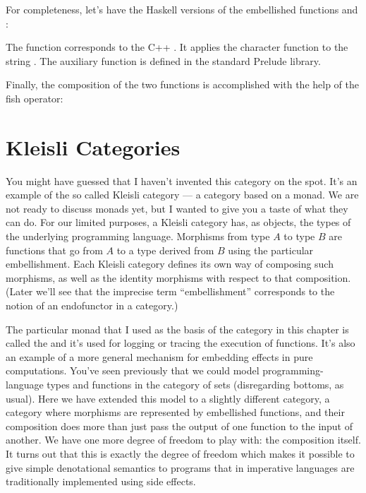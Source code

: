 For completeness, let's have the Haskell versions of the embellished
functions  and :

The function  corresponds to the C++ . It
applies the character function  to the string
. The auxiliary function  is defined in the
standard Prelude library.

Finally, the composition of the two functions is accomplished with the
help of the fish operator:


\section{Kleisli Categories}

You might have guessed that I haven't invented this category on the
spot. It's an example of the so called Kleisli category --- a category
based on a monad. We are not ready to discuss monads yet, but I wanted
to give you a taste of what they can do. For our limited purposes, a
Kleisli category has, as objects, the types of the underlying
programming language. Morphisms from type $A$ to type $B$ are functions that
go from $A$ to a type derived from $B$ using the particular embellishment.
Each Kleisli category defines its own way of composing such morphisms,
as well as the identity morphisms with respect to that composition.
(Later we'll see that the imprecise term ``embellishment'' corresponds
to the notion of an endofunctor in a category.)

The particular monad that I used as the basis of the category in this
chapter is called the  and it's used for logging or
tracing the execution of functions. It's also an example of a more
general mechanism for embedding effects in pure computations. You've
seen previously that we could model programming-language types and
functions in the category of sets (disregarding bottoms, as usual). Here
we have extended this model to a slightly different category, a category
where morphisms are represented by embellished functions, and their
composition does more than just pass the output of one function to the
input of another. We have one more degree of freedom to play with: the
composition itself. It turns out that this is exactly the degree of
freedom which makes it possible to give simple denotational semantics to
programs that in imperative languages are traditionally implemented
using side effects.

